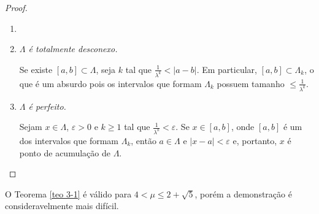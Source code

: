 \begin{proof}
\begin{enumerate}[label=\alph*)]\item[]
\item \textit{$\Lambda$ é totalmente desconexo.}

Se existe $[a, b] \subset \Lambda$, seja $k$ tal que $\frac{1}{\lambda^k} < |a - b|$.
Em particular, $[a, b] \subset \Lambda_k$, o que é um absurdo pois os intervalos que formam $\Lambda_k$ possuem tamanho $\leq \frac{1}{\lambda^k}$.

\item \textit{$\Lambda$ é perfeito.}

Sejam $x \in \Lambda$, $\varepsilon > 0$ e $k \geq 1$ tal que $\frac{1}{\lambda^k} < \varepsilon$.
Se $x \in [a, b]$, onde $[a, b]$ é um dos intervalos que formam $\Lambda_k$, então $a \in \Lambda$ e $|x - a| < \varepsilon$ e, portanto, $x$ é ponto de acumulação de $\Lambda$.
\end{enumerate}
\end{proof}

O Teorema \ref{teo 3-1} é válido para $4 < \mu \leq 2 + \sqrt{5}$, porém a demonstração é consideravelmente mais difícil.